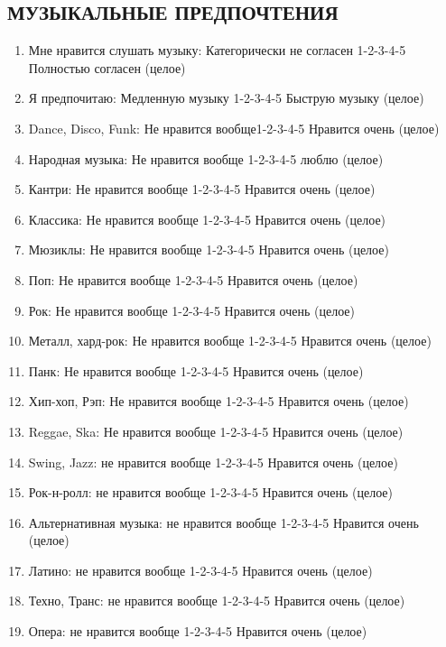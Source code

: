 \documentclass[11pt]{article}
\begin{document}
\subsection{МУЗЫКАЛЬНЫЕ ПРЕДПОЧТЕНИЯ}
\begin{enumerate}
\item Мне нравится слушать музыку: Категорически не согласен 1-2-3-4-5 Полностью согласен (целое)
\item Я предпочитаю: Медленную музыку 1-2-3-4-5 Быструю музыку (целое)
\item Dance, Disco, Funk: Не нравится вообще1-2-3-4-5 Нравится очень (целое)
\item Народная музыка: Не нравится вообще 1-2-3-4-5 люблю (целое)
\item Кантри: Не нравится вообще 1-2-3-4-5 Нравится очень (целое)
\item Классика: Не нравится вообще 1-2-3-4-5 Нравится очень (целое)
\item Мюзиклы: Не нравится вообще 1-2-3-4-5 Нравится очень (целое)
\item Поп: Не нравится вообще 1-2-3-4-5 Нравится очень (целое)
\item Рок: Не нравится вообще 1-2-3-4-5 Нравится очень (целое)
\item Металл, хард-рок: Не нравится вообще 1-2-3-4-5 Нравится очень (целое)
\item Панк: Не нравится вообще  1-2-3-4-5 Нравится очень (целое)
\item Хип-хоп, Рэп: Не нравится вообще 1-2-3-4-5 Нравится очень (целое)
\item Reggae, Ska: Не нравится вообще 1-2-3-4-5 Нравится очень (целое)
\item Swing, Jazz: не нравится вообще 1-2-3-4-5 Нравится очень (целое)
\item Рок-н-ролл: не нравится вообще 1-2-3-4-5 Нравится очень (целое)
\item Альтернативная музыка: не нравится вообще 1-2-3-4-5 Нравится очень (целое)
\item Латино: не нравится вообще 1-2-3-4-5 Нравится очень (целое)
\item Техно, Транс: не нравится вообще  1-2-3-4-5 Нравится очень (целое)
\item Опера: не нравится вообще  1-2-3-4-5 Нравится очень (целое)
\end{enumerate}
\end{document}
